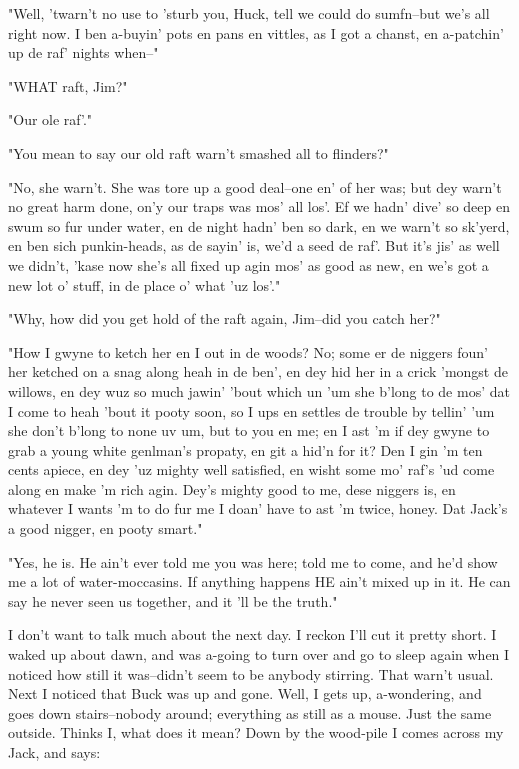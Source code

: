 "Well, 'twarn't no use to 'sturb you, Huck, tell we could do sumfn--but
we's all right now.  I ben a-buyin' pots en pans en vittles, as I got a
chanst, en a-patchin' up de raf' nights when--"

"WHAT raft, Jim?"

"Our ole raf'."

"You mean to say our old raft warn't smashed all to flinders?"

"No, she warn't.  She was tore up a good deal--one en' of her was; but
dey warn't no great harm done, on'y our traps was mos' all los'.  Ef we
hadn' dive' so deep en swum so fur under water, en de night hadn' ben so
dark, en we warn't so sk'yerd, en ben sich punkin-heads, as de sayin' is,
we'd a seed de raf'.  But it's jis' as well we didn't, 'kase now she's
all fixed up agin mos' as good as new, en we's got a new lot o' stuff, in
de place o' what 'uz los'."

"Why, how did you get hold of the raft again, Jim--did you catch her?"

"How I gwyne to ketch her en I out in de woods?  No; some er de niggers
foun' her ketched on a snag along heah in de ben', en dey hid her in a
crick 'mongst de willows, en dey wuz so much jawin' 'bout which un 'um
she b'long to de mos' dat I come to heah 'bout it pooty soon, so I ups en
settles de trouble by tellin' 'um she don't b'long to none uv um, but to
you en me; en I ast 'm if dey gwyne to grab a young white genlman's
propaty, en git a hid'n for it?  Den I gin 'm ten cents apiece, en dey
'uz mighty well satisfied, en wisht some mo' raf's 'ud come along en make
'm rich agin. Dey's mighty good to me, dese niggers is, en whatever I
wants 'm to do fur me I doan' have to ast 'm twice, honey.  Dat Jack's a
good nigger, en pooty smart."

"Yes, he is.  He ain't ever told me you was here; told me to come, and
he'd show me a lot of water-moccasins.  If anything happens HE ain't
mixed up in it.  He can say he never seen us together, and it 'll be the
truth."

I don't want to talk much about the next day.  I reckon I'll cut it
pretty short.  I waked up about dawn, and was a-going to turn over and go
to sleep again when I noticed how still it was--didn't seem to be anybody
stirring.  That warn't usual.  Next I noticed that Buck was up and gone.
Well, I gets up, a-wondering, and goes down stairs--nobody around;
everything as still as a mouse.  Just the same outside.  Thinks I, what
does it mean?  Down by the wood-pile I comes across my Jack, and says:

